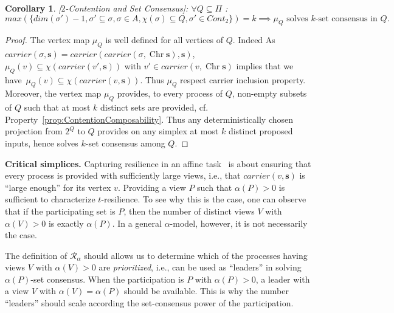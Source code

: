 \documentclass[a4paper]{article}
\newtheorem{corollary}[theorem]{Corollary}
\newcommand{\myparagraph}[1]{\vspace{6pt}\noindent \textbf{#1}}
\def\R{\ensuremath{\mathcal{R}}}
\def\s {\mathbf{s}}
\def\Chr{\operatorname{Chr}}
\def\Car{\mathit{carrier}}
\begin{document}
{\begin{corollary}{[$2$-Contention and Set Consensus]:} $\forall Q\subseteq\Pi$ :\\
\[max(\{{\mathit{dim}}(\sigma')-1,\sigma'\subseteq\sigma, \sigma\in A, \chi(\sigma)\subseteq Q, \sigma'\in{\mathit{Cont}_2}\})=k \implies \mu_Q \textrm{\ solves\ } k\textrm{-set\ consensus\ in\ } Q{}.\]
\end{corollary}

\begin{proof}
The vertex map $\mu_Q$ is well defined for all vertices of $Q$.
Indeed As $\Car(\sigma,\s)=\Car(\Car(\sigma,\Chr\s),\s)$, 
$\mu_Q(v)\subseteq \chi(\Car(v',\s))$ with $v'\in \Car(v,\Chr\s)$ 
implies that we have~$\mu_Q(v)\subseteq \chi(\Car(v,\s))$. Thus 
$\mu_Q$ respect carrier inclusion property.
Moreover, the vertex map $\mu_Q$ provides, to every process of $Q$, 
non-empty subsets of $Q$ such that at most $k$ distinct sets are provided, cf. Property~\ref{prop:ContentionComposability}.
Thus any deterministically chosen projection from $2^Q$ to $Q$
provides on any simplex at most $k$ distinct proposed inputs,
hence solves $k$-set consensus among $Q$.
\end{proof}
}


\myparagraph{Critical simplices.}
%
Capturing resilience in an affine task~\cite{SHG16} is about ensuring
that every process is provided with sufficiently large 
views, i.e., that $\Car(v,\s)$ is ``large enough'' for its vertex $v$.
%
Providing a view $P$ such that 
$\alpha(P)>0$ is sufficient to characterize $t$-resilience.
%
To see why this is the case, one can observe that if the participating
set is $P$, then the number of distinct views $V$ with $\alpha(V)>0$
is exactly $\alpha(P)$.
%
In a general $\alpha$-model, however, it is not necessarily the case.
%
%


The definition of $\R_{\alpha}$ should allows us to determine which
of the processes having views $V$ with $\alpha(V)>0$ 
are \emph{prioritized}, i.e., can be used as ``leaders'' in solving
$\alpha(P)$-set consensus.
%
When the participation is $P$ with $\alpha(P)>0$, a leader 
with a view $V$ with $\alpha(V)=\alpha(P)$ should be available.
This is why the number ``leaders'' should scale
according the set-consensus power of the participation.
\end{document}
